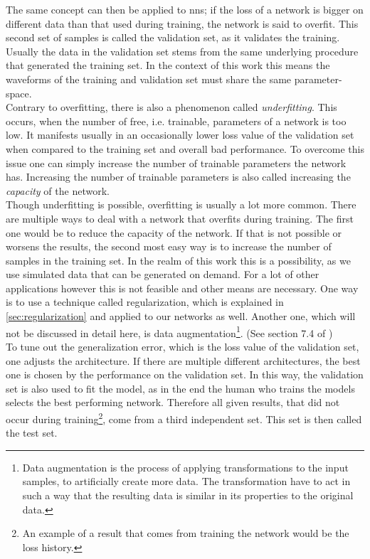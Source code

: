 The same concept can then be applied to \gls{nn}s; if the loss of a network is bigger on different data than that used during training, the network is said to overfit. This second set of samples is called the validation set, as it validates the training. Usually the data in the validation set stems from the same underlying procedure that generated the training set. In the context of this work this means the waveforms of the training and validation set must share the same parameter-space.\\
Contrary to overfitting, there is also a phenomenon called \emph{underfitting}. This occurs, when the number of free, i.e. trainable, parameters of a network is too low. It manifests usually in an occasionally lower loss value of the validation set when compared to the training set and overall bad performance. To overcome this issue one can simply increase the number of trainable parameters the network has. Increasing the number of trainable parameters is also called increasing the \emph{capacity} of the network.\\
Though underfitting is possible, overfitting is usually a lot more common. There are multiple ways to deal with a network that overfits during training. The first one would be to reduce the capacity of the network. If that is not possible or worsens the results, the second most easy way is to increase the number of samples in the training set. In the realm of this work this is a possibility, as we use simulated data that can be generated on demand. For a lot of other applications however this is not feasible and other means are necessary. One way is to use a technique called regularization, which is explained in \autoref{sec:regularization} and applied to our networks as well. Another one, which will not be discussed in detail here, is data augmentation\footnote{Data augmentation is the process of applying transformations to the input samples, to artificially create more data. The transformation have to act in such a way that the resulting data is similar in its properties to the original data.}. (See section 7.4 of \cite{deep_learning_book})\\
To tune out the generalization error, which is the loss value of the validation set, one adjusts the architecture. If there are multiple different architectures, the best one is chosen by the performance on the validation set. In this way, the validation set is also used to fit the model, as in the end the human who trains the models selects the best performing network. Therefore all given results, that did not occur during training\footnote{An example of a result that comes from training the network would be the loss history.}, come from a third independent set. This set is then called the test set.\medskip\\

